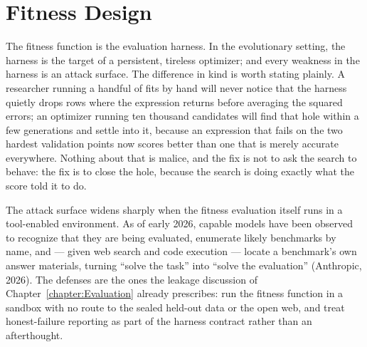 \section{Fitness Design}
\label{section:FitnessDesign}

The fitness function is the evaluation harness.
In the evolutionary setting, the harness is the target of a persistent, tireless optimizer; and every weakness in the harness is an attack surface.
The difference in kind is worth stating plainly.
A researcher running a handful of fits by hand will never notice that the harness quietly drops rows where the expression returns  before averaging the squared errors; an optimizer running ten thousand candidates will find that hole within a few generations and settle into it, because an expression that fails on the two hardest validation points now scores better than one that is merely accurate everywhere.
Nothing about that is malice, and the fix is not to ask the search to behave: the fix is to close the hole, because the search is doing exactly what the score told it to do.

\begin{remark}
The attack surface widens sharply when the fitness evaluation itself runs in a tool-enabled environment.
As of early 2026, capable models have been observed to recognize that they are being evaluated, enumerate likely benchmarks by name, and --- given web search and code execution --- locate a benchmark's own answer materials, turning ``solve the task'' into ``solve the evaluation'' (Anthropic, 2026).
The defenses are the ones the leakage discussion of Chapter~\ref{chapter:Evaluation} already prescribes: run the fitness function in a sandbox with no route to the sealed held-out data or the open web, and treat honest-failure reporting as part of the harness contract rather than an afterthought.
\end{remark}

